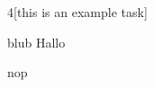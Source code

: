 
\begin{task}{4}[this is an example task]
	\begin{subtask}
	\item
		blub Hallo
	\item
		nop
	\end{subtask}
\end{task}
